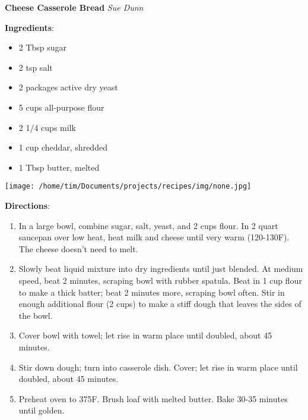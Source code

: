 \documentclass[11pt, twoside, openany]{book}
\begin{document}
\noindent\begin{minipage}[t]{\linewidth}%
{\Large\textbf{Cheese Casserole Bread}} \label{cheese-casserole-bread}\hfill\textit{Sue Dunn}\\
\noindent\begin{minipage}[t]{0.78\linewidth}%
\textbf{Ingredients}:\vspace{-3mm}
\begin{multicols}{2}
\begin{itemize}\setlength\itemsep{-1mm}
\item 2 Tbsp sugar
\item 2 tsp salt
\item 2 packages active dry yeast
\item 5 cups all-purpose flour
\item 2 1/4 cups milk
\item 1 cup cheddar, shredded
\item 1 Tbsp butter, melted
\end{itemize}
\end{multicols}
\end{minipage}
\noindent\begin{minipage}[t]{0.18\linewidth}
\centering \strut\vspace*{-\baselineskip}\newline
\texttt{[image: /home/tim/Documents/projects/recipes/img/none.jpg]}\\
\end{minipage}\vspace{3mm}
\textbf{Directions}:
\vspace{-3mm}\begin{enumerate}\setlength\itemsep{-1mm}
\item In a large bowl, combine sugar, salt, yeast, and 2 cups flour. In 2 quart saucepan over low heat, heat milk and cheese until very warm (120-130F). The cheese doesn't need to melt.
\item Slowly beat liquid mixture into dry ingredients until just blended. At medium speed, beat 2 minutes, scraping bowl with rubber spatula. Beat in 1 cup flour to make a thick batter; beat 2 minutes more, scraping bowl often. Stir in enough additional flour (2 cups) to make a stiff dough that leaves the sides of the bowl.
\item Cover bowl with towel; let rise in warm place until doubled, about 45 minutes.
\item Stir down dough; turn into casserole dish. Cover; let rise in warm place until doubled, about 45 minutes.
\item Preheat oven to 375F. Brush loaf with melted butter. Bake 30-35 minutes until golden.
\end{enumerate}
\end{minipage}\vspace{8mm}
\end{document}
